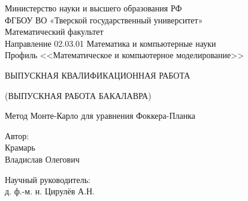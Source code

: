 \documentclass[a4paper]{report}
\begin{document}



\begin{titlepage}
     \begin{center}
          Министерство науки и высшего образования РФ\\
          ФГБОУ ВО «Тверской государственный университет»\\
          Математический факультет\\
          Направление 02.03.01 Математика и компьютерные науки\\
          Профиль <<Математическое и компьютерное моделирование>>     
     \end{center}

     \vspace{2.0cm}
     \begin{center}

          {ВЫПУСКНАЯ КВАЛИФИКАЦИОННАЯ РАБОТА }

          {(ВЫПУСКНАЯ РАБОТА БАКАЛАВРА)}


          \vspace{1.0cm}
          \large{Метод Монте-Карло для уравнения Фоккера-Планка}


          \vspace{1.5cm}
     \end{center}



     \begin{flushright}
          \begin{minipage}{65mm}
               Автор:\\
               Крамарь \\Владислав Олегович

               \vspace{1.0cm}
               Научный руководитель:\\
               д. ф.-м. н. Цирулёв А.Н.


\end{minipage}
\end{flushright}
\end{titlepage}
\end{document}
